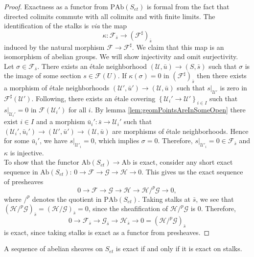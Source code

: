 \begin{proof}
Exactness as a functor from $\text{PAb}(S_{et})$ is formal from the fact that directed colimits commute with all colimits and with finite limits. The identification of the stalks is {\it via} the map
$$
\kappa : \mathcal{F}_{\bar s}\longrightarrow \left(\mathcal{F}^\sharp\right)_{\bar s}
$$
induced by the natural morphism $\mathcal{F}\to \mathcal{F}^\sharp$.  We claim that this map is an isomorphism of abelian groups.  We will show injectivity and omit surjectivity. 
\\
Let $\sigma\in \mathcal{F}_{\bar s}$. There exists an \'etale neighborhood $(\mathcal{U}, \bar u)\to (S, \bar s)$ such that $\sigma$ is the image of some section $s \in \mathcal{F}(U)$. If $\kappa(\sigma) = 0$ in $(\mathcal{F}^\sharp)_{\bar s}$ then there exists a morphism of \'etale neighborhoods $(\mathcal{U}', \bar u')\to (\mathcal{U}, \bar u)$ such that $s|_{\mathcal{U}'}$ is zero in $\mathcal{F}^\sharp(\mathcal{U}')$. Following, there exists an \'etale covering $\left\{\mathcal{U}_i'\to \mathcal{U}'\right\}_{i\in I}$ such that $s|_{\mathcal{U}_i'}=0$ in $\mathcal{F}(\mathcal{U}_i')$ for all $i$. By lemma \ref{lem:geomPointsAreInSomeOpen} there exist  $i \in I$ and a morphism $\bar u_i': \bar s \to \mathcal{U}_i'$ such that  $(\mathcal{U}_i', \bar u_i')\to (\mathcal{U}', \bar u')\to (\mathcal{U}, \bar u)$ are morphisms of \'etale neighborhoods. Hence for some $\bar u_i'$, we have $s|_{\mathcal{U}'_i}=0$, which implies $\sigma = 0$.  Therefore, $s|_{\mathcal{U}'_i} = 0 \in \mathcal{F}_{\bar s}$ and $\kappa$ is injective.
\\
To show that the functor $\text{Ab}(S_{et}) \to \text{Ab}$ is exact, consider any short exact sequence in $\text{Ab}(S_{et})$:
$
0\to \mathcal{F}\to \mathcal{G}\to \mathcal H \to 0.
$
This gives us the  exact sequence of presheaves
$$
0 \to \mathcal{F}\to \mathcal{G} \to \mathcal H\to \mathcal H/^p\mathcal{G} \to 0,
$$
where $/^p$ denotes the quotient in $\text{PAb}(S_{et})$. Taking stalks at $\bar s$, we see that $(\mathcal H /^p\mathcal{G})_{\bar{s}} = (\mathcal H /\mathcal{G})_{\bar{s}} = 0$, since the sheafification of $\mathcal H/^p\mathcal{G}$ is $0$. 
Therefore, 
$$
0\to \mathcal{F}_{\bar s	} \to \mathcal{G}_{\bar s} \to \mathcal{H}_{\bar s} \to 0 = (\mathcal H/^p\mathcal{G})_{\bar s}
$$
is exact, since taking stalks is exact as a functor from presheaves.
\end{proof}

\begin{theorem}
A sequence of abelian sheaves on $S_{et}$ is exact if and only if it is exact on stalks.  
\end{theorem}

